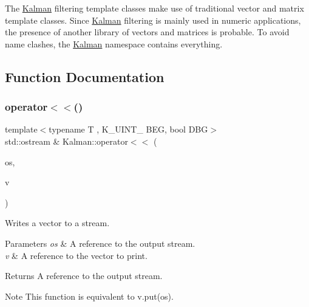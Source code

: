 The \mbox{\hyperlink{namespaceKalman}{Kalman}} filtering template classes make use of traditional vector and matrix template classes. Since \mbox{\hyperlink{namespaceKalman}{Kalman}} filtering is mainly used in numeric applications, the presence of another library of vectors and matrices is probable. To avoid name clashes, the {\ttfamily \mbox{\hyperlink{namespaceKalman}{Kalman}}} namespace contains everything. 

\subsection{Function Documentation}
\mbox{\label{namespaceKalman_a9ef55cd5e98291bb4749bbcc7f8e5f56}} 
\subsubsection{\texorpdfstring{operator$<$$<$()}{operator<<()}\hspace{0.1cm}{\footnotesize\ttfamily [1/2]}}
{\footnotesize\ttfamily template$<$typename T , K\+\_\+\+U\+I\+N\+T\+\_ B\+EG, bool D\+BG$>$ \\
std\+::ostream \& Kalman\+::operator$<$$<$ (\begin{DoxyParamCaption}\item[{std\+::ostream \&}]{os,  }\item[{const \mbox{\hyperlink{classKalman_1_1KVector}{K\+Vector}}$<$ T, B\+EG, D\+BG $>$ \&}]{v }\end{DoxyParamCaption})\hspace{0.3cm}{\ttfamily [inline]}}



Writes a vector to a stream. 


\begin{DoxyParams}{Parameters}
{\em os} & A reference to the output stream. \\
\hline
{\em v} & A reference to the vector to print. \\
\hline
\end{DoxyParams}
\begin{DoxyReturn}{Returns}
A reference to the output stream. 
\end{DoxyReturn}
\begin{DoxyNote}{Note}
This function is equivalent to {\ttfamily v.\+put(os)}. 
\end{DoxyNote}
\mbox{\label{namespaceKalman_a531684dadbec9b34313492f6d5121598}} 
